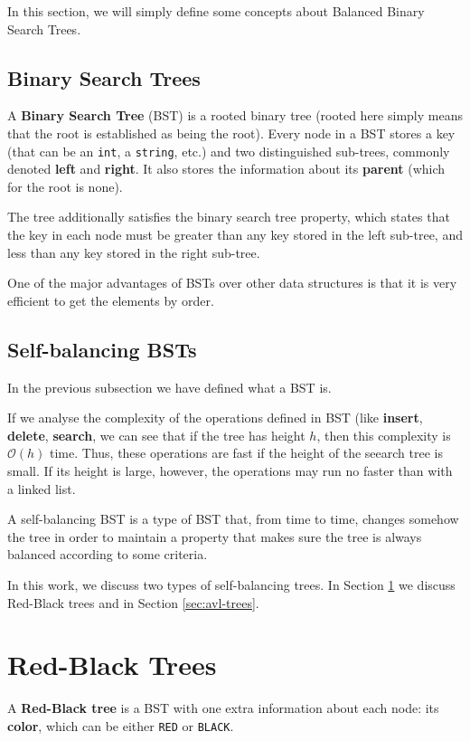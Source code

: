 \documentclass[12pt,a4paper,oneside]{article}
\theoremstyle{definition}
\begin{document}
In this section, we will simply define some concepts about Balanced Binary Search Trees.

\subsection{Binary Search Trees}\label{subsec:bst}

A \textbf{Binary Search Tree} (BST) is a rooted binary tree (rooted here simply means that the root is established as being the root). Every node in a BST stores a key (that can be an \texttt{int}, a \texttt{string}, etc.) and two distinguished sub-trees, commonly denoted \textbf{left} and \textbf{right}. It also stores the information about its \textbf{parent} (which for the root is none).

The tree additionally satisfies the binary search tree property, which states that the key in each node must be greater than any key stored in the left sub-tree, and less than any key stored in the right sub-tree.
 
One of the major advantages of BSTs over other data structures is that it is very efficient to get the elements by order.

\subsection{Self-balancing BSTs}\label{subsec:sb-BST}
In the previous subsection we have defined what a BST is.

If we analyse the complexity of the operations defined in BST (like \textbf{insert}, \textbf{delete}, \textbf{search}, we can see that if the tree has height $h$, then this complexity is $\mathcal{O} \left( h \right)$ time. Thus, these operations are fast if the height of the seearch tree is small. If its height is large, however, the operations may run no faster than with a linked list.

A self-balancing BST is a type of BST that, from time to time, changes somehow the tree in order to maintain a property that makes sure the tree is always balanced according to some criteria.

In this work, we discuss two types of self-balancing trees. In Section \ref{sec:rb-trees} we discuss Red-Black trees and in Section \ref{sec:avl-trees}.


\section{Red-Black Trees}\label{sec:rb-trees}
A \textbf{Red-Black tree} is a BST with one extra information about each node: its \textbf{color}, which can be either \texttt{RED} or \texttt{BLACK}.
\end{document}
